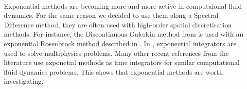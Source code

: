     \paragraph{}
    Exponential methods are becoming more and more active in computaional fluid dynamics.
    For the same reason we decided to use them along a Spectral Difference method, they are often used with high-order spatial discretisation methods.
    For instance, the Discontinuous-Galerkin method from \cite{Li2013} is used with an exponential Rosenbrock method described in \cite{LiLuoWangEtAl2018, Li2020}.
    In \cite{NarayanamurthiSandu2021}, exponential integrators are used to solve multiphysics problems.
    Many other recent references from the literature use exponetial methods as time integrators for similar computational fluid dynamics problems.
    This shows that exponential methods are worth investigating.
